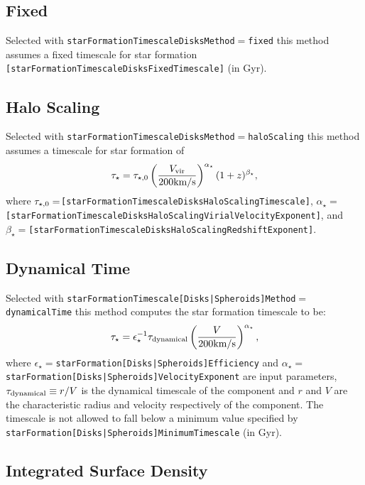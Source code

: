 \subsection{Fixed}

Selected with {\tt starFormationTimescaleDisksMethod}$=${\tt fixed} this method assumes a fixed timescale for star formation {\tt [starFormationTimescaleDisksFixedTimescale]} (in Gyr).

\subsection{Halo Scaling}

Selected with {\tt starFormationTimescaleDisksMethod}$=${\tt haloScaling} this method assumes a timescale for star formation of
\begin{equation}
 \tau_\star = \tau_{\rm \star,0} \left( {V_{\rm vir} \over 200\hbox{km/s}} \right)^{\alpha_\star} (1+z)^{\beta_\star},
\end{equation}
where $\tau_{\rm \star,0}=${\tt [starFormationTimescaleDisksHaloScalingTimescale]}, $\alpha_\star=${\tt [starFormationTimescaleDisksHaloScalingVirialVelocityExponent]}, and $\beta_\star=${\tt [starFormationTimescaleDisksHaloScalingRedshiftExponent]}.

\subsection{Dynamical Time}

Selected with {\tt starFormationTimescale[Disks|Spheroids]Method}$=${\tt dynamicalTime} this method computes the star formation timescale to be:
\begin{equation}
 \tau_\star = \epsilon_\star^{-1} \tau_{\rm dynamical} \left( {V \over 200\hbox{km/s}} \right)^{\alpha_\star},
\end{equation}
where $\epsilon_\star=${\tt starFormation[Disks|Spheroids]Efficiency} and $\alpha_\star=${\tt starFormation[Disks|Spheroids]VelocityExponent} are input parameters, $\tau_{\rm dynamical}\equiv r/V$ is the dynamical timescale of the \gls{component} and $r$ and $V$ are the characteristic radius and velocity respectively of the component. The timescale is not allowed to fall below a minimum value specified by {\tt starFormation[Disks|Spheroids]MinimumTimescale} (in Gyr).

\subsection{Integrated Surface Density}

